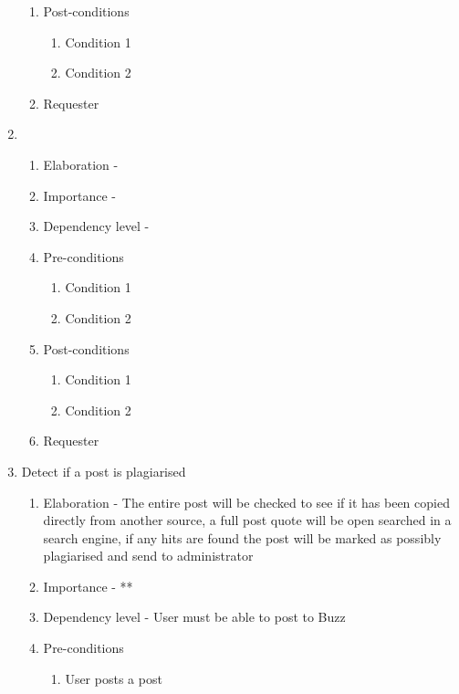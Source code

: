 \documentclass[12pt]{article}
\begin{document}
\begin{enumerate}
\begin{enumerate}
        \item Post-conditions
    \begin{enumerate}
    	\item Condition 1
    	\item Condition 2
    \end{enumerate}
    \item Requester
  \end{enumerate}
\newpage %
   \item  %
  \begin{enumerate}
    \item Elaboration - 
    \item Importance - 
    \item Dependency level - 
    \item Pre-conditions
    \begin{enumerate}
    	\item Condition 1
    	\item Condition 2
    \end{enumerate}
        \item Post-conditions
    \begin{enumerate}
    	\item Condition 1
    	\item Condition 2
    \end{enumerate}
    \item Requester
  \end{enumerate}
\newpage %
   \item Detect if a post is plagiarised  %
  \begin{enumerate}
    \item Elaboration - The entire post will be checked to see if it has been copied directly from another source, a full post quote will be open searched in a search engine, if any hits are found the post will be marked as possibly plagiarised and send to administrator
    \item Importance - **
    \item Dependency level - User must be able to post to Buzz
    \item Pre-conditions
    \begin{enumerate}
    	\item User posts a post
    \end{enumerate}

\end{enumerate}
\end{enumerate}
\end{document}
